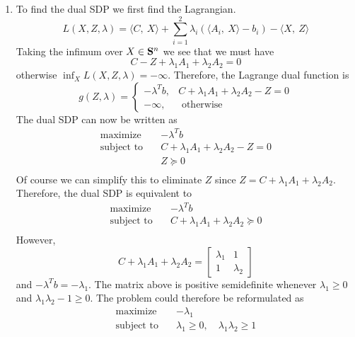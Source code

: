 \documentclass[11pt]{amsart}
\begin{document}
\begin{enumerate}
\begin{enumerate}
\item To find the dual SDP we first find the Lagrangian.
\[
L(X, Z, \lambda) = \langle C,\ X\rangle + \sum_{i=1}^2 \lambda_i (\langle A_i,\ X\rangle - b_i) - \langle X,\ Z \rangle
\]
Taking the infimum over $X \in {\bf S}^n$ we see that we must have
\[
C - Z + \lambda_1 A_1 + \lambda_2 A_2 = 0
\]
otherwise $\inf_X L(X, Z, \lambda) = -\infty$.  Therefore, the Lagrange dual function is
\[
g(Z,\lambda) = \begin{cases}
-\lambda^Tb, & C +  \lambda_1 A_1 + \lambda_2 A_2 - Z = 0\\
-\infty, & \text{ otherwise }
\end{cases}
\]
The dual SDP can now be written as
\begin{equation*}
\begin{aligned}
\mathrm{maximize} \quad & -\lambda^Tb  \\
\textrm{subject to}\quad &  C + \lambda_1 A_1 + \lambda_2 A_2 - Z= 0\\
& Z \succeq 0\\
\end{aligned}
\end{equation*}
Of course we can simplify this to eliminate $Z$ since $Z = C + \lambda_1 A_1 + \lambda_2 A_2$.  Therefore, the dual SDP is equivalent to
\begin{equation*}
\begin{aligned}
\mathrm{maximize} \quad & -\lambda^Tb  \\
\textrm{subject to}\quad &  C + \lambda_1 A_1 + \lambda_2 A_2 \succeq 0\\
\end{aligned}
\end{equation*}
However,
\[
C + \lambda_1 A_1 + \lambda_2 A_2 = \begin{bmatrix} \lambda_1 & 1\\ 1 & \lambda_2 \end{bmatrix}
\]
and $-\lambda^T b = -\lambda_1$.  The matrix above is positive semidefinite whenever $\lambda_1 \ge 0$ and $\lambda_1\lambda_2 - 1 \ge 0$.  The problem could therefore be reformulated as 
\begin{equation*}
\begin{aligned}
\mathrm{maximize} \quad & -\lambda_1  \\
\textrm{subject to}\quad & \lambda_1 \ge 0,\quad \lambda_1 \lambda_2 \ge 1 \\
\end{aligned}
\end{equation*}





\end{enumerate}
\end{enumerate}
\end{document}
